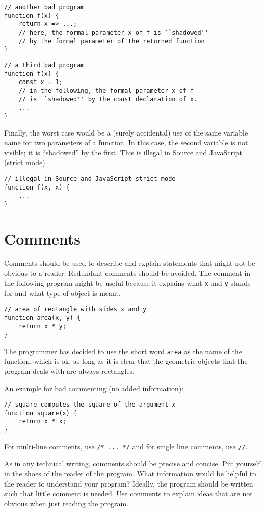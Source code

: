 \begin{lstlisting}
// another bad program
function f(x) {
    return x => ...;
    // here, the formal parameter x of f is ``shadowed'' 
    // by the formal parameter of the returned function
}
\end{lstlisting}

\begin{lstlisting}
// a third bad program
function f(x) {
    const x = 1;
    // in the following, the formal parameter x of f
    // is ``shadowed'' by the const declaration of x.
    ...
}
\end{lstlisting}
Finally, the worst case would be a (surely accidental) 
use of the same variable name for two parameters of a function.
In this case, the second variable is not visible; it is ``shadowed''
by the first. This is illegal in Source and JavaScript (strict mode).
\begin{lstlisting}
// illegal in Source and JavaScript strict mode
function f(x, x) {
    ...
}
\end{lstlisting}

\vspace{-4mm}

\section*{Comments}
Comments should be used to describe and explain statements 
that might not be obvious to a reader.
Redundant comments should be avoided. The comment in the following program might be
useful because it explains what \lstinline{x} and \lstinline{y} stands for and what type of
object is meant. 
\begin{lstlisting}
// area of rectangle with sides x and y
function area(x, y) {
    return x * y;
}
\end{lstlisting}
The programmer has decided to use the short word \lstinline{area} as the name of the function,
which is ok, as long as it is clear that the geometric objects that the program deals with
are always rectangles.

An example for bad commenting (no added information):
\begin{lstlisting}
// square computes the square of the argument x
function square(x) {
    return x * x;
}
\end{lstlisting}
%
For multi-line comments, use \lstinline{/* ... */} and for single line comments, use \lstinline{//}.

As in any technical writing, comments should be precise and concise. Put yourself in the
shoes of the reader of the program. What information would be helpful to the reader to
understand your program? Ideally, the program should be written such that little comment is
needed. Use comments to explain ideas that are not obvious when just reading the program.


      
